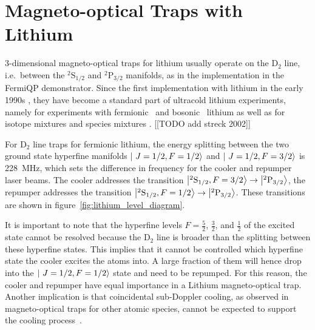 \section{Magneto-optical Traps with Lithium}
3-dimensional magneto-optical traps for lithium usually operate on the D$_2$ line, i.e.~between the $^2\text{S}_{1/2}$ and $^2\text{P}_{3/2}$ manifolds, as in the implementation in the FermiQP demonstrator. Since the first implementation with lithium in the early 1990s \cite{kawanaka_decay_1993}, they have become a standard part of ultracold lithium experiments, namely for experiments with fermionic~\cite{duarte_all-optical_2011,omran_microscopic_2015} and bosonic~\cite{kawanaka_decay_1993,schunemann_magneto-optic_1998} lithium as well as for isotope mixtures \cite{mewes_simultaneous_1999, hilker_laser_2012,kerkmann_novel_2019} and species mixtures \cite{ladouceur_compact_2009,tiecke_high-flux_2009,chen_lithium-cesium_2021}. [[TODO add streck 2002]]

For D$_2$ line traps for fermionic lithium, the energy splitting between the two ground state hyperfine manifolds $\Ket{~J=1/2, F=1/2}$ and $\Ket{~J=1/2, F=3/2}$ is \SI{228}{\mega\hertz}, which sets the difference in frequency for the cooler and repumper laser beams. The cooler addresses the transition $\Ket{^2\text{S}_{1/2}, F = 3/2} \rightarrow \Ket{^2\text{P}_{3/2}}$, the repumper addresses the transition $\Ket{^2\text{S}_{1/2}, F = 1/2} \rightarrow \Ket{^2\text{P}_{3/2}}$. These transitions are shown in figure~\ref{fig:lithium_level_diagram}.

It is important to note that the hyperfine levels $F = \frac{5}{2}$, $\frac{3}{2}$, and $\frac{1}{2}$ of the excited state cannot be resolved because the D$_2$ line is broader than the splitting between these hyperfine states. This implies that it cannot be controlled which hyperfine state the cooler excites the atoms into. A large fraction of them will hence drop into the $\Ket{~J=1/2, F=1/2}$ state and need to be repumped. For this reason, the cooler and repumper have equal importance in a Lithium magneto-optical trap. Another implication is that coincidental sub-Doppler cooling, as observed in magneto-optical traps for other atomic species, cannot be expected to support the cooling process~\cite{grier_lambda-enhanced_2013}.

